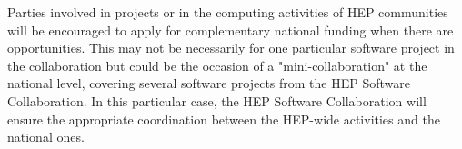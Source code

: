\documentclass[11pt]{article} %
\begin{document}
Parties involved in projects or in the computing activities of HEP communities will be encouraged to apply for complementary national
funding when there are opportunities. This may not be necessarily for one particular software project in the collaboration but could be
the occasion of a "mini-collaboration" at the national level, covering several software projects from the HEP Software Collaboration. In this
particular case, the HEP Software Collaboration will ensure the appropriate coordination between the HEP-wide activities and the national ones.
\end{document}
